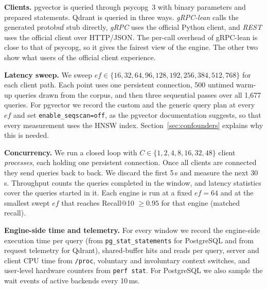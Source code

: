 \documentclass[sigconf, nonacm]{acmart}
\begin{document}
\textbf{Clients.} pgvector is queried through psycopg~3 with binary parameters and
prepared statements. Qdrant is queried in three ways. \emph{gRPC-lean} calls the
generated protobuf stub directly, \emph{gRPC} uses the official Python client, and
\emph{REST} uses the official client over HTTP/JSON. The per-call overhead of gRPC-lean
is close to that of psycopg, so it gives the fairest view of the engine. The other two
show what users of the official client experience.

\textbf{Latency sweep.} We sweep $ef\in\{16,32,64,96,128,192,256,384,512,768\}$ for
each client path. Each point uses one persistent connection, 500 untimed warm-up queries
drawn from the corpus, and then three sequential passes over all 1{,}677 queries. For
pgvector we record the custom and the generic query plan at every $ef$ and set
\texttt{enable\_seqscan=off}, as the pgvector documentation suggests, so that every
measurement uses the HNSW index. Section~\ref{sec:confounders} explains why this is
needed.

\textbf{Concurrency.} We run a closed loop with $C\in\{1,2,4,8,16,32,48\}$ client
\emph{processes}, each holding one persistent connection. Once all clients are
connected they send queries back to back. We discard the first 5\,s and measure the next
30\,s. Throughput counts the queries completed in the window, and latency statistics
cover the queries started in it. Each engine is run at a fixed $ef=64$ and at the
smallest swept $ef$ that reaches Recall@10 $\geq 0.95$ for that engine (matched recall).

\textbf{Engine-side time and telemetry.} For every window we record the engine-side
execution time per query (from \texttt{pg\_stat\_statements} for PostgreSQL and from
request telemetry for Qdrant), shared-buffer hits and reads per query, server and client
CPU time from \texttt{/proc}, voluntary and involuntary context switches, and user-level
hardware counters from \texttt{perf stat}. For PostgreSQL we also sample the wait events
of active backends every 10\,ms.
\end{document}
